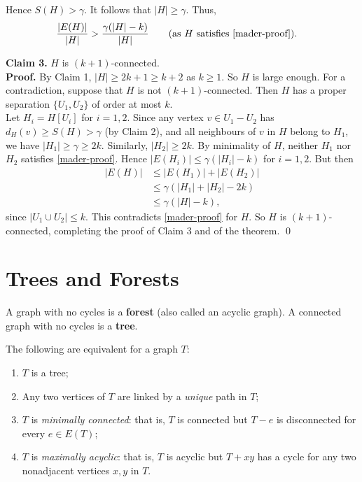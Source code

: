 \begin{theorem}[Mader, 1973]
{    Hence \(S(H) > \gamma\). It follows that \(|H| \geq \gamma\). Thus,
    \begin{align*}
        \frac{|E(H)|}{|H|} & > \frac{\gamma(|H|- k)}{|H|} \tag{as \(H\) satisfies \ref{mader-proof}}.
    \end{align*}

    {\bf Claim 3.} \(H\) is \((k + 1)\)-connected. \\
    {\bf Proof.} By Claim 1, \(|H| \geq 2k + 1 \geq k + 2\) as \(k \geq 1\). So \(H\) is large enough. For a contradiction, suppose that \(H\) is not \((k + 1)\)-connected. Then \(H\) has a proper separation \(\{U_1, U_2\}\) of order at most \(k\). \\

    Let \(H_i = H[U_i]\) for \(i = 1, 2\). Since any vertex \(v \in U_1 - U_2\) has \(d_H(v) \geq S(H) > \gamma\) (by Claim 2), and all neighbours of \(v\) in \(H\) belong to \(H_1\), we have \(|H_1| \geq \gamma \geq 2k\). Similarly, \(|H_2| \geq 2k\). By minimality of \(H\), neither \(H_1\) nor \(H_2\) satisfies \ref{mader-proof}. Hence \(|E(H_i)| \leq \gamma(|H_i| - k)\) for \(i = 1, 2\). But then
    \begin{align*}
        |E(H)| & \leq |E(H_1)| + |E(H_2)|                           \\
               & \leq \gamma(|H_1| + |H_2| - 2k)                    \\
               & \leq \gamma(|H| - k), \tag{by inclusion-exclusion}
    \end{align*}
    since \(|U_1 \cup U_2| \leq k\). This contradicts \ref{mader-proof} for \(H\). So \(H\) is \((k + 1)\)-connected, completing the proof of Claim 3 and of the theorem.
    \qed
    }
\end{theorem}

\section{Trees and Forests}
A graph with no cycles is a \textbf{forest} (also called an acyclic graph). A connected graph with no cycles is a \textbf{tree}.

\begin{theorem} \label{tree-equiv}
    The following are equivalent for a graph \(T\):
    \begin{enumerate}[label=(\roman*)]
        \item \(T\) is a tree;
        \item Any two vertices of \(T\) are linked by a \textit{unique} path in \(T\);
        \item \(T\) is \textit{minimally connected}: that is, \(T\) is connected but \(T - e\) is disconnected for every \(e \in E(T)\);
        \item \(T\) is \textit{maximally acyclic}: that is, \(T\) is acyclic but \(T + xy\) has a cycle for any two nonadjacent vertices \(x, y\) in \(T\).
    \end{enumerate}
\end{theorem}

